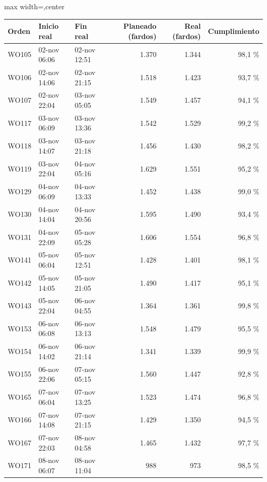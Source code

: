 \begin{singlespace}
{\par\smallskip\noindent\begingroup\footnotesize\setlength{\tabcolsep}{3.5pt}\renewcommand{\arraystretch}{1.18}
\begin{adjustbox}{max width=\linewidth,center}\begin{tabular}{@{}lllrrr@{}}
\toprule
\rowcolor{tblhead}\textbf{Orden} & \textbf{Inicio real} & \textbf{Fin real} & \textbf{Planeado (fardos)} & \textbf{Real (fardos)} & \textbf{Cumplimiento} \\
\midrule
WO105 & 02-nov 06:06 & 02-nov 12:51 & 1.370 & 1.344 & 98,1 \% \\
\rowcolor{tblzebra}WO106 & 02-nov 14:06 & 02-nov 21:15 & 1.518 & 1.423 & 93,7 \% \\
WO107 & 02-nov 22:04 & 03-nov 05:05 & 1.549 & 1.457 & 94,1 \% \\
\rowcolor{tblzebra}WO117 & 03-nov 06:09 & 03-nov 13:36 & 1.542 & 1.529 & 99,2 \% \\
WO118 & 03-nov 14:07 & 03-nov 21:18 & 1.456 & 1.430 & 98,2 \% \\
\rowcolor{tblzebra}WO119 & 03-nov 22:04 & 04-nov 05:16 & 1.629 & 1.551 & 95,2 \% \\
WO129 & 04-nov 06:09 & 04-nov 13:33 & 1.452 & 1.438 & 99,0 \% \\
\rowcolor{tblzebra}WO130 & 04-nov 14:04 & 04-nov 20:56 & 1.595 & 1.490 & 93,4 \% \\
WO131 & 04-nov 22:09 & 05-nov 05:28 & 1.606 & 1.554 & 96,8 \% \\
\rowcolor{tblzebra}WO141 & 05-nov 06:04 & 05-nov 12:51 & 1.428 & 1.401 & 98,1 \% \\
WO142 & 05-nov 14:05 & 05-nov 21:05 & 1.490 & 1.417 & 95,1 \% \\
\rowcolor{tblzebra}WO143 & 05-nov 22:04 & 06-nov 04:55 & 1.364 & 1.361 & 99,8 \% \\
WO153 & 06-nov 06:08 & 06-nov 13:13 & 1.548 & 1.479 & 95,5 \% \\
\rowcolor{tblzebra}WO154 & 06-nov 14:02 & 06-nov 21:14 & 1.341 & 1.339 & 99,9 \% \\
WO155 & 06-nov 22:06 & 07-nov 05:15 & 1.560 & 1.447 & 92,8 \% \\
\rowcolor{tblzebra}WO165 & 07-nov 06:04 & 07-nov 13:25 & 1.523 & 1.474 & 96,8 \% \\
WO166 & 07-nov 14:08 & 07-nov 21:15 & 1.429 & 1.350 & 94,5 \% \\
\rowcolor{tblzebra}WO167 & 07-nov 22:03 & 08-nov 04:58 & 1.465 & 1.432 & 97,7 \% \\
WO171 & 08-nov 06:07 & 08-nov 11:04 & 988 & 973 & 98,5 \% \\

\end{tabular}
\end{adjustbox}}
\end{singlespace}
